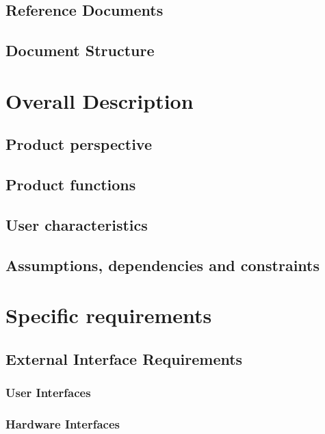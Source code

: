 \documentclass{Configuration_Files/PoliMi3i_thesis}
\begin{document}
\section{Reference Documents}

\section{Document Structure}


\chapter{Overall Description}

\section{Product perspective}

\section{Product functions}

\section{User characteristics}

\section{Assumptions, dependencies and constraints}


\chapter{Specific requirements}

\section{External Interface Requirements}

\subsection{User Interfaces}

\subsection{Hardware Interfaces}
\end{document}

